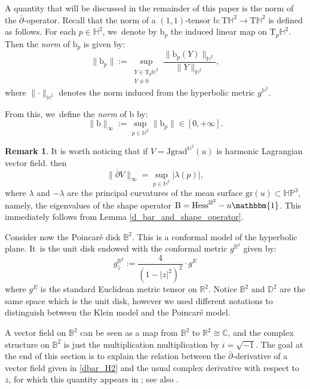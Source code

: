\documentclass[JEP,XML,SOM,Unicode,NoEqCountersInSection, NoFloatCountersInSection,published]{cedram}
\theoremstyle{plain}
\theoremstyle{definition}
\newtheorem{remark}[cor]{Remark}
\newcommand{\bb}{\mathrm{b}}
\newcommand{\HP}{\mathbb{HP}^3}
\newcommand{\grad}{\mathrm{grad}^{\mathbb{H}^2}}
\newcommand{\hess}{\mathrm{Hess}^{\mathbb{H}^2}}
\newcommand{\J}{\mathrm{J}}
\newcommand{\B}{\mathrm{B}}
\begin{document}
A quantity that will be discussed in the remainder of this paper is the norm of the $\overline{\partial}$-operator. Recall that the norm of a $(1,1)$-tensor $\bb: \mathrm{T}\mathbb{H}^2 \to \mathrm{T}\mathbb{H}^2$ is defined as follows. For each $p \in \mathbb{H}^2$, we~denote by $\bb_p$ the induced linear map on $\mathrm{T}_p\mathbb{H}^2$. Then the \emph{norm} of $\bb_p$ is given by:
\begin{equation}\label{norme}
\lVert \bb_p \rVert := \sup_{\substack{Y\in\mathrm{T}_p\mathbb{H}^2\\Y\neq 0}} \frac{\lVert \bb_p(Y) \rVert_{\mathbb{H}^2}}{\lVert Y \rVert_{\mathbb{H}^2}},
\end{equation}
where $\lVert \cdot \rVert_{\mathbb{H}^2}$ denotes the norm induced from the hyperbolic metric $g^{\mathbb{H}^2}$.

From this, we~define the \emph{norm} of $\bb$ by:
\[
\lVert \bb \rVert_{\infty} := \sup_{p \in \mathbb{H}^2} \lVert \bb_p \rVert \in [0, +\infty].
\]

\begin{remark}\label{principal_curvature}
It is worth noticing that if $V=\J\grad(u)$ is harmonic Lagrangian vector field. then
\[
\lVert \overline{\partial}V\rVert_{\infty}=\sup_{p\in\mathbb{H}^2}\lvert\lambda(p)\rvert,
\]
where $\lambda$ and $-\lambda$ are the principal curvatures of the mean surface $\mathrm{gr}(u)\subset\HP$, namely, the eigenvalues of the shape operator $\B=\hess-u\mathbbm{1}$. This immediately follows from Lemma \ref{d_bar_and_shape_operator}.
\end{remark}

Consider now the Poincaré disk $\mathbb{B}^2$. This is a conformal model of the hyperbolic plane. It~is the unit disk endowed with the conformal metric $g^{\mathbb{B}^2}$ given by:
\[
g^{\mathbb{B}^2}_{z}:=\frac{4}{(1-\lvert z\rvert^2)^2}\cdot g^{E}
\]
where $g^E$ is the standard Euclidean metric tensor on $\mathbb{R}^2$. Notice $\mathbb{B}^2$ and $\mathbb{D}^2$ are the same space which is the unit disk, however we used different notations to distinguish between the Klein model and the Poincaré model.

A vector field on $\mathbb{B}^2$ can be seen as a map from $\mathbb{B}^2$ to $\mathbb{R}^2\cong\mathbb{C}$, and the complex structure on $\mathbb{B}^2$ is just the multiplication multiplication by $i=\sqrt{-1}$. The goal at the end of this section is to explain the relation between the $\overline{\partial}$-derivative of a vector field given in \eqref{dbar_H2} and the usual complex derivative with respect to $\overline{z}$, for which this quantity appears in \cite{Extension_with_bounded_derivative}; see also \cite{FanJun}.
\end{document}
